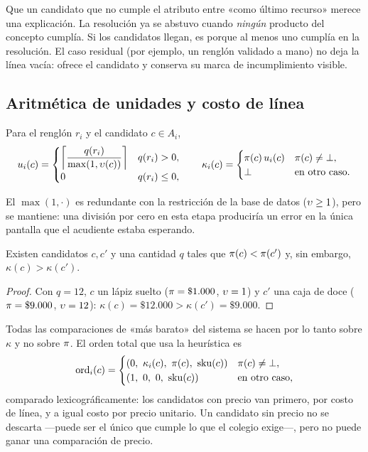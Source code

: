 Que un candidato que no cumple el atributo entre «como último recurso»
merece una explicación. La resolución ya se abstuvo cuando \emph{ningún}
producto del concepto cumplía. Si los candidatos llegan, es porque al menos
uno cumplía en la resolución. El caso residual (por ejemplo, un renglón
validado a mano) no deja la línea vacía: ofrece el candidato y conserva su
marca de incumplimiento visible.

\subsection{Aritmética de unidades y costo de línea}
\label{sec:opt-unidades}

\begin{definicion}
\label{def:unidades}
Para el renglón $r_i$ y el candidato $c\in A_i$,
\[
  u_i(c)=\begin{cases}\left\lceil \dfrac{q(r_i)}{\max(1,\upsilon(c))} \right\rceil & q(r_i)>0,\\[4pt] 0 & q(r_i)\leq0,\end{cases}
  \qquad
  \kappa_i(c)=\begin{cases}\pi(c)\,u_i(c) & \pi(c)\neq\bot,\\ \bot & \text{en otro caso.}\end{cases}
\]
\end{definicion}

El $\max(1,\cdot)$ es redundante con la restricción de la base de datos
($\upsilon\geq1$), pero se mantiene: una división por cero en esta etapa
produciría un error en la única pantalla que el acudiente estaba esperando.

\begin{lema}
\label{lem:precio-unitario}
Existen candidatos $c,c'$ y una cantidad $q$ tales que
$\pi(c)<\pi(c')$ y, sin embargo, $\kappa(c)>\kappa(c')$.
\end{lema}

\begin{proof}
Con $q=12$, $c$ un lápiz suelto ($\pi=\$1.000$, $\upsilon=1$) y $c'$ una caja de
doce ($\pi=\$9.000$, $\upsilon=12$): $\kappa(c)=\$12.000>\kappa(c')=\$9.000$.
\end{proof}

Todas las comparaciones de «más barato» del sistema se hacen por lo tanto
sobre $\kappa$ y no sobre $\pi$. El orden total que usa la heurística es
\[
  \mathrm{ord}_i(c)=\begin{cases}(0,\ \kappa_i(c),\ \precio(c),\ \mathrm{sku}(c)) & \precio(c)\neq\sinprecio,\\
  (1,\ 0,\ 0,\ \mathrm{sku}(c)) & \text{en otro caso,}\end{cases}
\]
comparado lexicográficamente: los candidatos con precio van primero, por costo
de línea, y a igual costo por precio unitario. Un candidato sin precio no se
descarta ---puede ser el único que cumple lo que el colegio exige---, pero no
puede ganar una comparación de precio.

